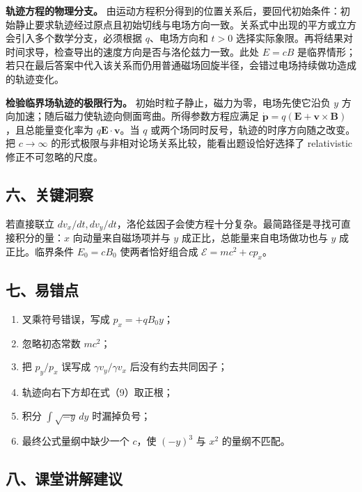\documentclass[12pt,a4paper,UTF8]{ctexart}
\newcommand{\tightlist}{\setlength{\itemsep}{0pt}\setlength{\parskip}{0pt}}
\begin{document}
\textbf{轨迹方程的物理分支。}
由运动方程积分得到的位置关系后，要回代初始条件：初始静止要求轨迹经过原点且初始切线与电场方向一致。关系式中出现的平方或立方会引入多个数学分支，必须根据
\(q\)、电场方向和 \(t>0\)
选择实际象限。再将结果对时间求导，检查导出的速度方向是否与洛伦兹力一致。此处
\(E=cB\)
是临界情形；若只在最后答案中代入该关系而仍用普通磁场回旋半径，会错过电场持续做功造成的轨迹变化。

\textbf{检验临界场轨迹的极限行为。}
初始时粒子静止，磁力为零，电场先使它沿负 \(y\)
方向加速；随后磁力使轨迹向侧面弯曲。所得参数方程应满足
\(\dot{\boldsymbol p}=q(\boldsymbol E+\boldsymbol v\times\boldsymbol B)\)，且总能量变化率为
\(q\boldsymbol E\cdot\boldsymbol v\)。当 \(q\)
或两个场同时反号，轨迹的时序方向随之改变。把 \(c\to\infty\)
的形式极限与非相对论场关系比较，能看出题设恰好选择了 relativistic
修正不可忽略的尺度。

\subsection{六、关键洞察}\label{ux516dux5173ux952eux6d1eux5bdf-5}

若直接联立
\(dv_x/dt,dv_y/dt\)，洛伦兹因子会使方程十分复杂。最简路径是寻找可直接积分的量：\(x\)
向动量来自磁场项并与 \(y\) 成正比，总能量来自电场做功也与 \(y\)
成正比。临界条件 \(E_0=cB_0\) 使两者恰好组合成
\(\mathcal E=mc^2+cp_x\)。

\subsection{七、易错点}\label{ux4e03ux6613ux9519ux70b9-5}

\begin{enumerate}
\def\labelenumi{\arabic{enumi}.}
\tightlist
\item
  叉乘符号错误，写成 \(p_x=+qB_0y\)；
\item
  忽略初态常数 \(mc^2\)；
\item
  把 \(p_y/p_x\) 误写成 \(\gamma v_y/\gamma v_x\) 后没有约去共同因子；
\item
  轨迹向右下方却在式（9）取正根；
\item
  积分 \(\int\sqrt{-y}\,dy\) 时漏掉负号；
\item
  最终公式量纲中缺少一个 \(c\)，使 \((-y)^3\) 与 \(x^2\) 的量纲不匹配。
\end{enumerate}

\subsection{八、课堂讲解建议}\label{ux516bux8bfeux5802ux8bb2ux89e3ux5efaux8bae-5}
\end{document}
